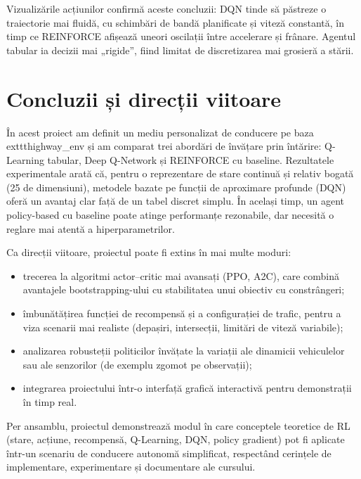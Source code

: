 \documentclass[11pt,a4paper]{article}
\begin{document}
Vizualizările acțiunilor confirmă aceste concluzii: DQN tinde să păstreze o
traiectorie mai fluidă, cu schimbări de bandă planificate și viteză constantă,
în timp ce REINFORCE afișează uneori oscilații între accelerare și frânare.
Agentul tabular ia decizii mai „rigide”, fiind limitat de discretizarea mai
grosieră a stării.

\section{Concluzii și direcții viitoare}

În acest proiect am definit un mediu personalizat de conducere pe baza
  exttt{highway\_env} și am comparat trei abordări de învățare prin
întărire: Q-Learning tabular, Deep Q-Network și REINFORCE cu baseline.
Rezultatele experimentale arată că, pentru o reprezentare de stare continuă
și relativ bogată (25 de dimensiuni), metodele bazate pe funcții de aproximare
profunde (DQN) oferă un avantaj clar față de un tabel discret simplu. În același
timp, un agent policy-based cu baseline poate atinge performanțe rezonabile,
dar necesită o reglare mai atentă a hiperparametrilor.

Ca direcții viitoare, proiectul poate fi extins în mai multe moduri:
\begin{itemize}
  \item trecerea la algoritmi actor--critic mai avansați (PPO, A2C), care
  combină avantajele bootstrapping-ului cu stabilitatea unui obiectiv cu
  constrângeri;
  \item îmbunătățirea funcției de recompensă și a configurației de trafic,
  pentru a viza scenarii mai realiste (depașiri, intersecții, limitări de
  viteză variabile);
  \item analizarea robusteții politicilor învățate la variații ale
  dinamicii vehiculelor sau ale senzorilor (de exemplu zgomot pe observații);
  \item integrarea proiectului într-o interfață grafică interactivă pentru
  demonstrații în timp real.
\end{itemize}

Per ansamblu, proiectul demonstrează modul în care conceptele teoretice de RL
(stare, acțiune, recompensă, Q-Learning, DQN, policy gradient) pot fi aplicate
într-un scenariu de conducere autonomă simplificat, respectând cerințele de
implementare, experimentare și documentare ale cursului.
\end{document}
